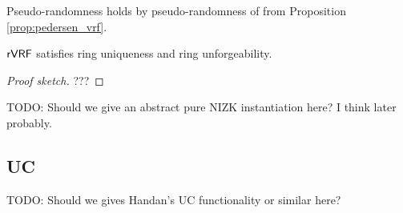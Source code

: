 Pseudo-randomness holds by pseudo-randomness of \PedVRF from
 Proposition \ref{prop:pedersen_vrf}.

\begin{proposition}\label{prop:pedersen_rvrf}
${\mathsf{rVRF}}$ satisfies ring uniqueness and ring unforgeability.
\end{proposition}

\begin{proof}[Proof sketch]
???
\end{proof}


TODO:  Should we give an abstract pure NIZK instantiation here?  I think later probably.


\subsection{UC}

TODO: Should we gives Handan's UC functionality or similar here? 




\endinput




\noindent 
\begin{itemize}

\item {\em Ring } - 
  Assuming ,
 a PPT adversary $\adv$ cannot distinguish a random function from
  any evaluation map $F_{\sk_i} : \msg \mapsto \Eval(\sk,\msg)$,
 even given $\ctx_0 = \{ \pk_1,\ldots,\pk_i \}$ and
  chosen-message queries to $\rVRF.\rSign(\sk_i,\openring)$,
  except with odds negligible in $\lambda$.
\end{itemize}


\begin{definition}
We say \rVRF satisfies {\em ring pseudo-randomness} if 
any PPT adversary $\adv$ has only a negligible advantage in $\lambda$
in this chosen-message game:
\begin{itemize}
 \item First, a challenger
  generates keypairs $(\pk_1,\sk_1),\ldots,(\pk_1,\sk_1) \leftarrow \KeyGen$ and
  defines a signing oracles $\ora{Sign}_i$ given by
  $(\compk,\openpk,\msg,\aux) \mapsto \Sign(\sk_i,\openpk,\msg,\aux)$,
   except it logs $\msg$ and aborts if $\pk_i \ne \OpenKey(\compk,\openpk)$.
 \item Next $\adv$ receives the $\pk_i$, repeatedly queries $\ora{Sign}_i $,
  and produces $\compk,\openpk,\msg,\aux$. 
 \item If $\adv$ never queried $\ora{Sign}(\cdot,\cdot,\msg,\cdot)$ then
  $\adv$ wins by distinguishing $\Eval(\sk,\msg)$ from random value.
\end{itemize}
\end{definition}


